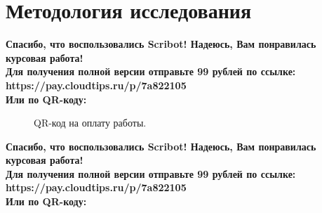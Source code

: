 \documentclass{article}
\begin{document}
\newpage

\section{Методология исследования}
\begin{center}
    \textbf{
        Спасибо, что воспользовались Scribot! Надеюсь, Вам понравилась курсовая работа!\\
        Для получения полной версии отправьте 99 рублей по ссылке:\\
        https://pay.cloudtips.ru/p/7a822105\\
        Или по QR-коду:\\
    }
\end{center}
\begin{figure}[h]
    \caption{QR-код на оплату работы.}
    \label{ris:image}
\end{figure}
\newpage
\begin{center}
    \textbf{
        Спасибо, что воспользовались Scribot! Надеюсь, Вам понравилась курсовая работа!\\
        Для получения полной версии отправьте 99 рублей по ссылке:\\
        https://pay.cloudtips.ru/p/7a822105\\
        Или по QR-коду:\\
    }
\end{center}
\end{document}
